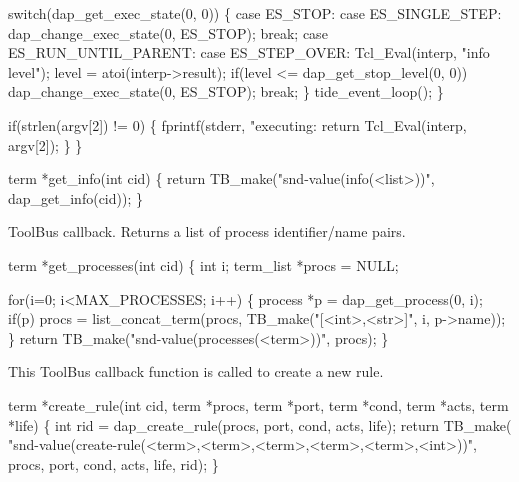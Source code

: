     switch(dap_get_exec_state(0, 0)) \{
      case ES_STOP:             
      case ES_SINGLE_STEP:      dap_change_exec_state(0, ES_STOP);
                                break;
      case ES_RUN_UNTIL_PARENT:
      case ES_STEP_OVER:        Tcl_Eval(interp, "info level");
                                level = atoi(interp->result);
                                if(level <= dap_get_stop_level(0, 0))
                                  dap_change_exec_state(0, ES_STOP);
                                break;
    \}
    tide_event_loop();
  \}

  if(strlen(argv[2]) != 0) \{
    fprintf(stderr, "executing: %
    return Tcl_Eval(interp, argv[2]);
  \}
\}
\nwendcode{}\nwdocspar



\nwenddocs{}\endmoddef\let\nwnotused=\nwoutput{}
term *get_info(int cid)
\{
  return TB_make("snd-value(info(<list>))", dap_get_info(cid));
\}
\nwendcode{}\nwdocspar


ToolBus callback. Returns a list of process identifier/name pairs.

\nwenddocs{}\endmoddef\let\nwnotused=\nwoutput{}
term *get_processes(int cid)
\{
  int i;
  term_list *procs = NULL;

  for(i=0; i<MAX_PROCESSES; i++) \{
    process *p = dap_get_process(0, i);
    if(p)
      procs = list_concat_term(procs, TB_make("[<int>,<str>]", i, p->name));
  \}
  return TB_make("snd-value(processes(<term>))", procs);
\}
\nwendcode{}\nwdocspar


This ToolBus callback function is called to create a new rule. 

\nwenddocs{}\endmoddef\let\nwnotused=\nwoutput{}
term *create_rule(int cid, term *procs, term *port, term *cond, term *acts, term *life)
\{
  int rid = dap_create_rule(procs, port, cond, acts, life);
  return TB_make(
        "snd-value(create-rule(<term>,<term>,<term>,<term>,<term>,<int>))",
        procs, port, cond, acts, life, rid);
\}
\nwendcode{}\nwdocspar

